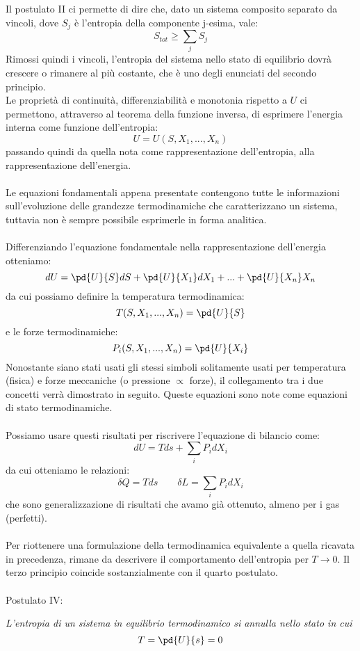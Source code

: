 \documentclass{article}
\begin{document}
Il postulato II ci permette di dire che, dato un sistema composito separato da vincoli, dove $S_j$ è l'entropia della componente j-esima, vale:
$$ S_{tot}\geq \sum_jS_j $$
Rimossi quindi i vincoli, l'entropia del sistema nello stato di equilibrio dovrà crescere o rimanere al più costante, che è uno degli enunciati del secondo principio.\\
Le proprietà di continuità, differenziabilità e monotonia rispetto a $U$ ci permettono, attraverso al teorema della funzione inversa, di esprimere l'energia interna come funzione dell'entropia:
$$ U = U(S, X_1, ..., X_n) $$
passando quindi da quella nota come rappresentazione dell'entropia, alla rappresentazione dell'energia.\\\\
Le equazioni fondamentali appena presentate contengono tutte le informazioni sull'evoluzione delle grandezze termodinamiche che caratterizzano un sistema, tuttavia non è sempre possibile esprimerle in forma analitica.\\\\
Differenziando l'equazione fondamentale nella rappresentazione dell'energia otteniamo:
$$ dU = \pd{U}{S}dS+\pd{U}{X_1}dX_1+...+\pd{U}{X_n}X_n $$
da cui possiamo definire la temperatura termodinamica:
$$ T(S, X_1, ..., X_n) = \pd{U}{S} $$
e le forze termodinamiche:
$$ P_i(S, X_1, ..., X_n) = \pd{U}{X_i} $$ 
Nonostante siano stati usati gli stessi simboli solitamente usati per temperatura (fisica) e forze meccaniche (o pressione $\propto$ forze), il collegamento tra i due concetti verrà dimostrato in seguito.
Queste equazioni sono note come equazioni di stato termodinamiche.\\\\
Possiamo usare questi risultati per riscrivere l'equazione di bilancio come:
$$ dU=Tds+\sum_iP_idX_i $$
da cui otteniamo le relazioni:
$$ \delta Q = Tds \qquad \delta L = \sum_iP_idX_i $$
che sono generalizzazione di risultati che avamo già ottenuto, almeno per i gas (perfetti).\\\\
Per riottenere una formulazione della termodinamica equivalente a quella ricavata in precedenza, rimane da descrivere il comportamento dell'entropia per $T\rightarrow0$. Il terzo principio coincide sostanzialmente con il quarto postulato.\\\\
Postulato IV:
\begin{center}
    \textit{L'entropia di un sistema in equilibrio termodinamico si annulla nello stato in cui
    $$ T = \pd{U}{s}=0 $$}
\end{center}
\end{document}
